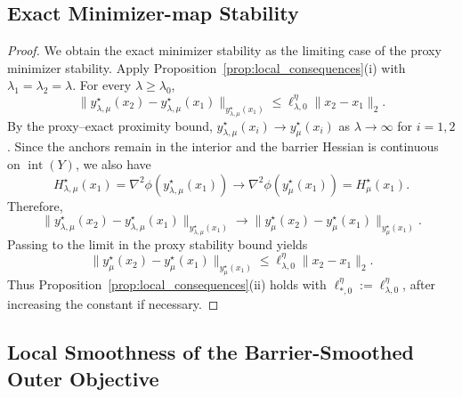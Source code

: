\documentclass{article}
\begin{document}
\subsection{Exact Minimizer-map Stability}

\begin{proof}
We obtain the exact minimizer stability as the limiting case of the proxy minimizer stability.
Apply Proposition~\ref{prop:local_consequences}\textup{(i)} with
\(\lambda_1=\lambda_2=\lambda\). For every \(\lambda\ge\lambda_0\),
\[
\|y_{\lambda,\mu}^\star(x_2)-y_{\lambda,\mu}^\star(x_1)\|_{y_{\lambda,\mu}^\star(x_1)}
\le
\ell_{\lambda,0}^{\eta}\|x_2-x_1\|_2 .
\]
By the proxy--exact proximity bound,
\(y_{\lambda,\mu}^\star(x_i)\to y_\mu^\star(x_i)\) as \(\lambda\to\infty\) for \(i=1,2\).
Since the anchors remain in the interior and the barrier Hessian is continuous on \(\operatorname{int}(Y)\),
we also have
\[
H_{\lambda,\mu}^\star(x_1)
=
\nabla^2\phi(y_{\lambda,\mu}^\star(x_1))
\to
\nabla^2\phi(y_\mu^\star(x_1))
=
H_\mu^\star(x_1).
\]
Therefore,
\[
\|y_{\lambda,\mu}^\star(x_2)-y_{\lambda,\mu}^\star(x_1)\|_{y_{\lambda,\mu}^\star(x_1)}
\to
\|y_\mu^\star(x_2)-y_\mu^\star(x_1)\|_{y_\mu^\star(x_1)} .
\]
Passing to the limit in the proxy stability bound yields
\[
\|y_\mu^\star(x_2)-y_\mu^\star(x_1)\|_{y_\mu^\star(x_1)}
\le
\ell_{\lambda,0}^{\eta}\|x_2-x_1\|_2 .
\]
Thus Proposition~\ref{prop:local_consequences}\textup{(ii)} holds with
\(\ell_{*,0}^{\eta}:=\ell_{\lambda,0}^{\eta}\), after increasing the constant if necessary.
\end{proof}


\subsection{Local Smoothness of the Barrier-Smoothed Outer Objective}
\end{document}
